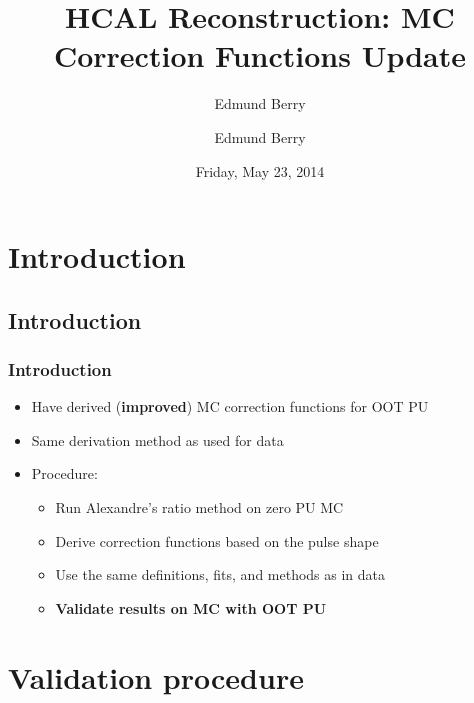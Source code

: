 \documentclass[bigger]{beamer}
\institute[Brown University]{\inst{1} Brown University}
\title{HCAL Reconstruction: \newline MC Correction Functions Update}
\author{Edmund Berry}
\date{Friday, May 23, 2014}
\author[Edmund Berry]{\alert{Edmund Berry}\inst{1}}
\providecommand{\alert}[1]{\textbf{#1}}
\begin{document}
\maketitle


\section{Introduction}
\label{sec-1}
\subsection{Introduction}
\label{sec-1-1}
\begin{frame}
\frametitle{Introduction}
\label{sec-1-1-1}
\begin{itemize}

\item Have derived (\alert{improved}) MC correction functions for OOT PU
\label{sec-1-1-1-1}%

\item Same derivation method as used for data
\label{sec-1-1-1-2}%

\item Procedure:
\label{sec-1-1-1-3}%
\begin{itemize}

\item Run Alexandre's ratio method on zero PU MC
\label{sec-1-1-1-3-1}%

\item Derive correction functions based on the pulse shape
\label{sec-1-1-1-3-2}%

\item Use the same definitions, fits, and methods as in data
\label{sec-1-1-1-3-3}%

\item \alert{Validate results on MC with OOT PU}
\label{sec-1-1-1-3-4}%
\end{itemize} %
\end{itemize} %
\end{frame}
\section{Validation procedure}
\label{sec-2}
\end{document}
